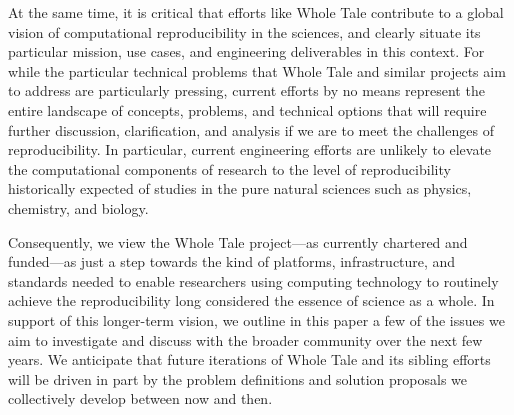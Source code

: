 At the same time, it is critical that efforts like Whole Tale contribute to a global 
	vision of computational reproducibility in the sciences, and clearly situate 
	its particular mission, use cases, and engineering deliverables in this context.
For while the particular technical problems that Whole Tale and similar projects
	aim to address are particularly pressing, current efforts by no means
	represent the entire landscape of concepts, problems, and technical options
	that will require further discussion, clarification, and analysis if we are to meet
	the challenges of reproducibility.
In particular, current engineering efforts are unlikely to elevate the computational components
	of research to the level of reproducibility historically expected of studies in the
	pure natural sciences such as physics, chemistry, and biology.

Consequently, we view the Whole Tale project---as currently chartered and funded---as just a step
	towards the kind of platforms, infrastructure, and standards
	needed to enable researchers using computing technology to routinely 
	achieve the reproducibility long considered the essence of science as a whole.
In support of this longer-term vision, we outline in this paper %
 a few of the issues	we aim to investigate and discuss with the broader community over the next few years.
We anticipate that future iterations of Whole Tale and its sibling efforts 
	will be driven in part by the problem definitions and solution proposals we collectively
	develop between now and then.





